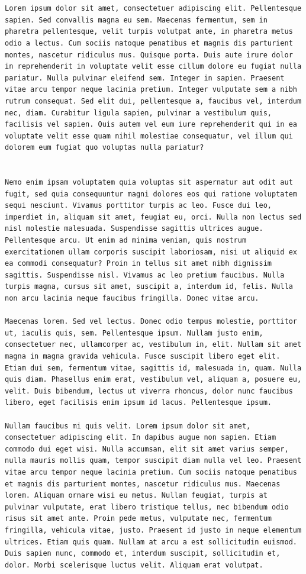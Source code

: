 \documentclass[a4paper, 12pt]{article}
\begin{document}
\begin{verbatim}


Lorem ipsum dolor sit amet, consectetuer adipiscing elit. Pellentesque sapien. Sed convallis magna eu sem. Maecenas fermentum, sem in pharetra pellentesque, velit turpis volutpat ante, in pharetra metus odio a lectus. Cum sociis natoque penatibus et magnis dis parturient montes, nascetur ridiculus mus. Quisque porta. Duis aute irure dolor in reprehenderit in voluptate velit esse cillum dolore eu fugiat nulla pariatur. Nulla pulvinar eleifend sem. Integer in sapien. Praesent vitae arcu tempor neque lacinia pretium. Integer vulputate sem a nibh rutrum consequat. Sed elit dui, pellentesque a, faucibus vel, interdum nec, diam. Curabitur ligula sapien, pulvinar a vestibulum quis, facilisis vel sapien. Quis autem vel eum iure reprehenderit qui in ea voluptate velit esse quam nihil molestiae consequatur, vel illum qui dolorem eum fugiat quo voluptas nulla pariatur?


Nemo enim ipsam voluptatem quia voluptas sit aspernatur aut odit aut fugit, sed quia consequuntur magni dolores eos qui ratione voluptatem sequi nesciunt. Vivamus porttitor turpis ac leo. Fusce dui leo, imperdiet in, aliquam sit amet, feugiat eu, orci. Nulla non lectus sed nisl molestie malesuada. Suspendisse sagittis ultrices augue. Pellentesque arcu. Ut enim ad minima veniam, quis nostrum exercitationem ullam corporis suscipit laboriosam, nisi ut aliquid ex ea commodi consequatur? Proin in tellus sit amet nibh dignissim sagittis. Suspendisse nisl. Vivamus ac leo pretium faucibus. Nulla turpis magna, cursus sit amet, suscipit a, interdum id, felis. Nulla non arcu lacinia neque faucibus fringilla. Donec vitae arcu.

Maecenas lorem. Sed vel lectus. Donec odio tempus molestie, porttitor ut, iaculis quis, sem. Pellentesque ipsum. Nullam justo enim, consectetuer nec, ullamcorper ac, vestibulum in, elit. Nullam sit amet magna in magna gravida vehicula. Fusce suscipit libero eget elit. Etiam dui sem, fermentum vitae, sagittis id, malesuada in, quam. Nulla quis diam. Phasellus enim erat, vestibulum vel, aliquam a, posuere eu, velit. Duis bibendum, lectus ut viverra rhoncus, dolor nunc faucibus libero, eget facilisis enim ipsum id lacus. Pellentesque ipsum.

Nullam faucibus mi quis velit. Lorem ipsum dolor sit amet, consectetuer adipiscing elit. In dapibus augue non sapien. Etiam commodo dui eget wisi. Nulla accumsan, elit sit amet varius semper, nulla mauris mollis quam, tempor suscipit diam nulla vel leo. Praesent vitae arcu tempor neque lacinia pretium. Cum sociis natoque penatibus et magnis dis parturient montes, nascetur ridiculus mus. Maecenas lorem. Aliquam ornare wisi eu metus. Nullam feugiat, turpis at pulvinar vulputate, erat libero tristique tellus, nec bibendum odio risus sit amet ante. Proin pede metus, vulputate nec, fermentum fringilla, vehicula vitae, justo. Praesent id justo in neque elementum ultrices. Etiam quis quam. Nullam at arcu a est sollicitudin euismod. Duis sapien nunc, commodo et, interdum suscipit, sollicitudin et, dolor. Morbi scelerisque luctus velit. Aliquam erat volutpat.


\end{verbatim}
\end{document}
